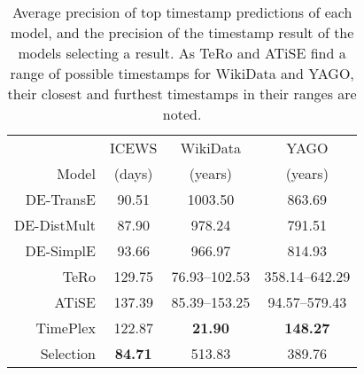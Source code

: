 \begin{table}[htb]
\centering
\begin{minipage}{\columnwidthcaption}
\centering
\caption{Average precision of top timestamp predictions of each model, and the precision of the timestamp result of the models selecting a result. As TeRo and ATiSE find a range of possible timestamps for WikiData and YAGO, their closest and furthest timestamps in their ranges are noted.}
\vspace{-3mm}

\begin{tabular}{r|ccc}\hline
 & ICEWS & WikiData & YAGO \\
Model & (days) & (years) & (years) \\ \hline
DE-TransE & 90.51 & 1003.50 & 863.69 \\ 
DE-DistMult & 87.90 & 978.24 & 791.51 \\ 
DE-SimplE & 93.66 & 966.97 & 814.93 \\ 
TeRo & 129.75 & 76.93–102.53 & 358.14–642.29 \\
ATiSE & 137.39 & 85.39–153.25 & 94.57–579.43 \\ 
TimePlex & 122.87 & \textbf{21.90} & \textbf{148.27}\\
\hline
Selection & \textbf{84.71} & 513.83 & 389.76 \\ \hline 

\end{tabular}

\label{tab:timestamp_voting_table}
\end{minipage}
\end{table}

